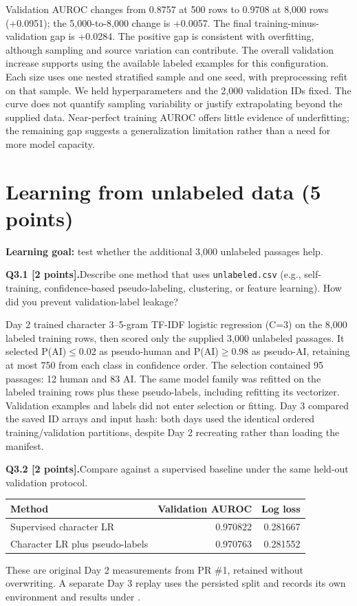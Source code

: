 \documentclass[11pt,letterpaper]{article}
\newcommand{\question}[2]{\needspace{4\baselineskip}\par\addvspace{0.45em}\noindent\textbf{#1}\quad #2\par\nobreak\vspace{0.1em}}
\begin{document}
Validation AUROC changes from 0.8757 at 500 rows to 0.9708 at 8,000 rows (+0.0951); the 5,000-to-8,000 change is +0.0057. The final training-minus-validation gap is +0.0284. The positive gap is consistent with overfitting, although sampling and source variation can contribute. The overall validation increase supports using the available labeled examples for this configuration. Each size uses one nested stratified sample and one seed, with preprocessing refit on that sample. We held hyperparameters and the 2,000 validation IDs fixed. The curve does not quantify sampling variability or justify extrapolating beyond the supplied data. Near-perfect training AUROC offers little evidence of underfitting; the remaining gap suggests a generalization limitation rather than a need for more model capacity.

\section{Learning from unlabeled data (5 points)}
\textbf{Learning goal:} test whether the additional 3,000 unlabeled passages help.
\question{Q3.1 [2 points].}{Describe one method that uses \texttt{unlabeled.csv} (e.g., self-training, confidence-based pseudo-labeling, clustering, or feature learning). How did you prevent validation-label leakage?}

Day 2 trained character 3--5-gram TF-IDF logistic regression (C=3) on the 8,000 labeled training rows, then scored only the supplied 3,000 unlabeled passages. It selected P(AI)$\leq$0.02 as pseudo-human and P(AI)$\geq$0.98 as pseudo-AI, retaining at most 750 from each class in confidence order. The selection contained 95 passages: 12 human and 83 AI. The same model family was refitted on the labeled training rows plus these pseudo-labels, including refitting its vectorizer. Validation examples and labels did not enter selection or fitting. Day 3 compared the saved ID arrays and input hash: both days used the identical ordered training/validation partitions, despite Day 2 recreating rather than loading the manifest.

\question{Q3.2 [2 points].}{Compare against a supervised baseline under the same held-out validation protocol.}

\begin{tabularx}{\linewidth}{@{}Yrr@{}}\toprule Method & Validation AUROC & Log loss \\ \midrule
Supervised character LR & 0.970822 & 0.281667 \\
Character LR plus pseudo-labels & 0.970763 & 0.281552 \\
\bottomrule\end{tabularx}
These are original Day 2 measurements from PR \#1, retained without overwriting. A separate Day 3 replay uses the persisted split and records its own environment and results under .
\end{document}
